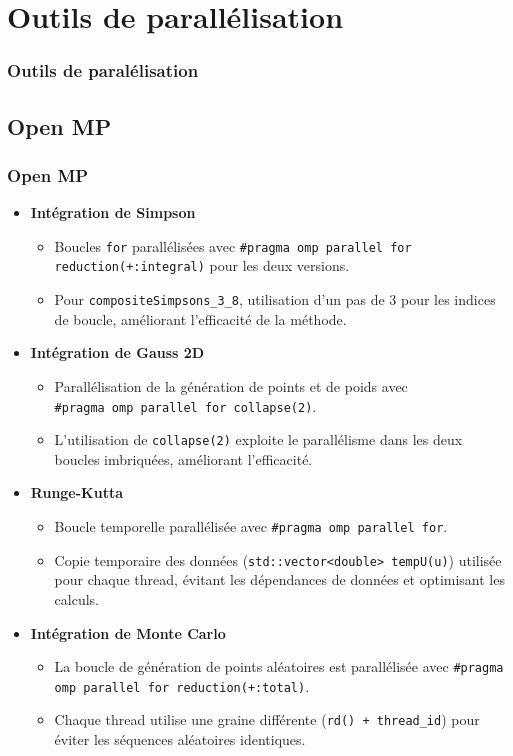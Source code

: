 \documentclass[10pt]{beamer}
\begin{document}
\section{Outils de parallélisation}

\begin{frame}
    \frametitle{Outils de paralélisation}
    \tableofcontents[currentsection]
\end{frame}

\subsection{Open MP}
\begin{frame}
    \frametitle{Open MP}
    \small
    \begin{itemize}
        \item \textbf{Intégration de Simpson}
            \begin{itemize}
                \item Boucles \texttt{for} parallélisées avec \texttt{\#pragma omp parallel for reduction(+:integral)} pour les deux versions.
                \item Pour \texttt{compositeSimpsons\_3\_8}, utilisation d'un pas de 3 pour les indices de boucle, améliorant l'efficacité de la méthode.
            \end{itemize}
        \item \textbf{Intégration de Gauss 2D }
            \begin{itemize}
                \item Parallélisation de la génération de points et de poids avec \\\texttt{\#pragma omp parallel for collapse(2)}.
                \item L'utilisation de \texttt{collapse(2)} exploite le parallélisme dans les deux boucles imbriquées, améliorant l'efficacité.
            \end{itemize}
        \item \textbf{Runge-Kutta }
            \begin{itemize}
                \item Boucle temporelle parallélisée avec \texttt{\#pragma omp parallel for}.
                \item Copie temporaire des données (\texttt{std::vector<double> tempU(u)}) utilisée pour chaque thread, évitant les dépendances de données et optimisant les calculs.
            \end{itemize}
        \item \textbf{Intégration de Monte Carlo }
            \begin{itemize}
                \item La boucle de génération de points aléatoires est parallélisée avec \texttt{\#pragma omp parallel for reduction(+:total)}.
                \item Chaque thread utilise une graine différente (\texttt{rd() + thread\_id}) pour éviter les séquences aléatoires identiques.
            \end{itemize}
    \end{itemize}
\end{frame}
\end{document}
